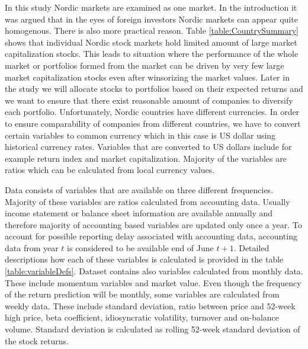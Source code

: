 \documentclass{article}
\begin{document}
In this study Nordic markets are examined as one market. In the introduction it was argued that in the eyes of foreign investors Nordic markets can appear quite homogenous. There is also more practical reason. Table \ref{table:CountrySummary} shows that individual Nordic stock markets hold limited amount of large market capitalization stocks. This leads to situation where the performance of the whole market or portfolios formed from the market can be driven by very few large market capitalization stocks even after winsorizing the market values. Later in the study we will allocate stocks to portfolios based on their expected returns and we want to ensure that there exist reasonable amount of companies to diversify each portfolio. Unfortunately, Nordic countries have different currencies. In order to ensure comparability of companies from different countries, we have to convert certain variables to common currency which in this case is US dollar using historical currency rates. Variables that are converted to US dollars include for example return index and market capitalization. Majority of the variables are ratios which can be calculated from local currency values. 

Data consists of variables that are available on three different frequencies. Majority of these variables are ratios calculated from accounting data. 
Usually income statement or balance sheet information are available annually and therefore majority of accounting based variables are updated only once a year. To account for possible reporting delay associated with accounting data, accounting data from year $t$ is considered to be available end of June $t+1$. Detailed descriptions how each of these variables is calculated is provided in the table \ref{table:variableDefs}. Dataset contains also variables calculated from monthly data. These include momentum variables and market value. Even though the frequency of the return prediction will be monthly, some variables are calculated from weekly data. These include standard deviation, ratio between price and 52-week high price, beta coefficient, idiosyncratic volatility, turnover and on-balance volume. Standard deviation is calculated as rolling 52-week standard deviation of the stock returns. 
\end{document}
